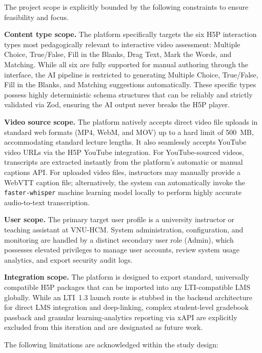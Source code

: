 The project scope is explicitly bounded by the following constraints to ensure feasibility and focus.

\textbf{Content type scope.} The platform specifically targets the six H5P interaction types most pedagogically relevant to interactive video assessment: Multiple Choice, True/False, Fill in the Blanks, Drag Text, Mark the Words, and Matching. While all six are fully supported for manual authoring through the interface, the AI pipeline is restricted to generating Multiple Choice, True/False, Fill in the Blanks, and Matching suggestions automatically. These specific types possess highly deterministic schema structures that can be reliably and strictly validated via Zod, ensuring the AI output never breaks the H5P player.

\textbf{Video source scope.} The platform natively accepts direct video file uploads in standard web formats (MP4, WebM, and MOV) up to a hard limit of 500~MB, accommodating standard lecture lengths. It also seamlessly accepts YouTube video URLs via the H5P YouTube integration. For YouTube-sourced videos, transcripts are extracted instantly from the platform's automatic or manual captions API. For uploaded video files, instructors may manually provide a WebVTT caption file; alternatively, the system can automatically invoke the \texttt{faster-whisper} machine learning model locally to perform highly accurate audio-to-text transcription.

\textbf{User scope.} The primary target user profile is a university instructor or teaching assistant at VNU-HCM. System administration, configuration, and monitoring are handled by a distinct secondary user role (Admin), which possesses elevated privileges to manage user accounts, review system usage analytics, and export security audit logs.

\textbf{Integration scope.} The platform is designed to export standard, universally compatible H5P packages that can be imported into any LTI-compatible LMS globally. While an LTI~1.3 launch route is stubbed in the backend architecture for direct LMS integration and deep-linking, complex student-level gradebook passback and granular learning-analytics reporting via xAPI are explicitly excluded from this iteration and are designated as future work.

The following limitations are acknowledged within the study design:

